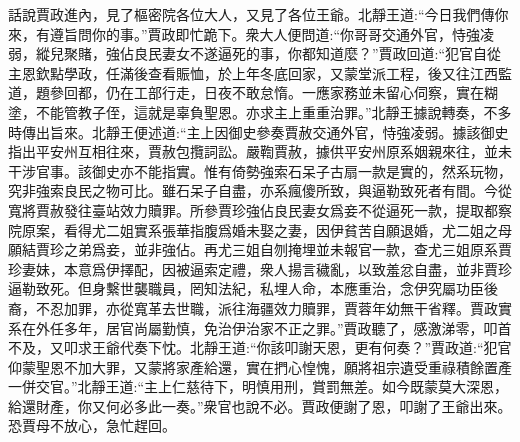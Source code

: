 


\begin{parag}
    話說賈政進內，見了樞密院各位大人，又見了各位王爺。北靜王道:“今日我們傳你來，有遵旨問你的事。”賈政即忙跪下。衆大人便問道:“你哥哥交通外官，恃強凌弱，縱兒聚賭，強佔良民妻女不遂逼死的事，你都知道麼？”賈政回道:“犯官自從主恩欽點學政，任滿後查看賑恤，於上年冬底回家，又蒙堂派工程，後又往江西監道，題參回都，仍在工部行走，日夜不敢怠惰。一應家務並未留心伺察，實在糊塗，不能管教子侄，這就是辜負聖恩。亦求主上重重治罪。”北靜王據說轉奏，不多時傳出旨來。北靜王便述道:“主上因御史參奏賈赦交通外官，恃強凌弱。據該御史指出平安州互相往來，賈赦包攬詞訟。嚴鞫賈赦，據供平安州原系姻親來往，並未干涉官事。該御史亦不能指實。惟有倚勢強索石呆子古扇一款是實的，然系玩物，究非強索良民之物可比。雖石呆子自盡，亦系瘋傻所致，與逼勒致死者有間。今從寬將賈赦發往臺站效力贖罪。所參賈珍強佔良民妻女爲妾不從逼死一款，提取都察院原案，看得尤二姐實系張華指腹爲婚未娶之妻，因伊貧苦自願退婚，尤二姐之母願結賈珍之弟爲妾，並非強佔。再尤三姐自刎掩埋並未報官一款，查尤三姐原系賈珍妻妹，本意爲伊擇配，因被逼索定禮，衆人揚言穢亂，以致羞忿自盡，並非賈珍逼勒致死。但身繫世襲職員，罔知法紀，私埋人命，本應重治，念伊究屬功臣後裔，不忍加罪，亦從寬革去世職，派往海疆效力贖罪，賈蓉年幼無干省釋。賈政實系在外任多年，居官尚屬勤慎，免治伊治家不正之罪。”賈政聽了，感激涕零，叩首不及，又叩求王爺代奏下忱。北靜王道:“你該叩謝天恩，更有何奏？”賈政道:“犯官仰蒙聖恩不加大罪，又蒙將家產給還，實在捫心惶愧，願將祖宗遺受重祿積餘置產一併交官。”北靜王道:“主上仁慈待下，明慎用刑，賞罰無差。如今既蒙莫大深恩，給還財產，你又何必多此一奏。”衆官也說不必。賈政便謝了恩，叩謝了王爺出來。恐賈母不放心，急忙趕回。
\end{parag}


